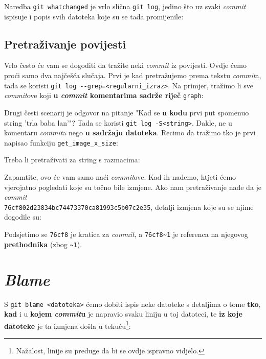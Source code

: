 Naredba \verb+git whatchanged+ je vrlo slična \verb+git log+, jedino što uz svaki \emph{commit} ispisuje i popis svih datoteka koje su se tada promijenile:



\subsection*{Pretraživanje povijesti}

Vrlo često će vam se dogoditi da tražite neki \emph{commit} iz povijesti.
Ovdje ćemo proći samo dva najčešća slučaja.
Prvi je kad pretražujemo prema tekstu \emph{commit}a, tada se koristi \verb+git log --grep=<regularni_izraz>+.
Na primjer, tražimo li sve \emph{commit}ove koji \textbf{u \emph{commit} komentarima sadrže riječ} \verb+graph+:


Drugi česti scenarij je odgovor na pitanje "Kad se \textbf{u kodu} prvi put spomenuo string 'trla baba lan'"? Tada se koristi \verb+git log -S<string>+.
Dakle, ne u komentaru \emph{commit}a nego \textbf{u sadržaju datoteka}.
Recimo da tražimo tko je prvi napisao funkciju \verb+get_image_x_size+:


Treba li pretraživati za string s razmacima:


Zapamtite, ovo će vam samo naći \emph{commit}ove.
Kad ih nađemo, htjeti ćemo vjerojatno pogledati koje su točno bile izmjene.
Ako nam pretraživanje nađe da je \emph{commit} \\ \verb+76cf802d23834bc74473370ca81993c5b07c2e35+, detalji izmjena koje su se njime dogodile su:


Podsjetimo se \verb+76cf8+ je kratica za \emph{commit}, a \verb+76cf8~1+ je referenca na njegovog \textbf{prethodnika} (zbog \verb+~1+).

\section*{\emph{Blame}}

S \verb+git blame <datoteka>+ ćemo dobiti ispis neke datoteke s detaljima o tome \textbf{tko}, \textbf{kad} i u \textbf{kojem \emph{commit}u} je napravio svaku liniju u toj datoteci, te \textbf{iz koje datoteke} je ta izmjena došla u tekuću\footnote{Nažalost, linije su preduge da bi se ovdje ispravno vidjelo.}:

